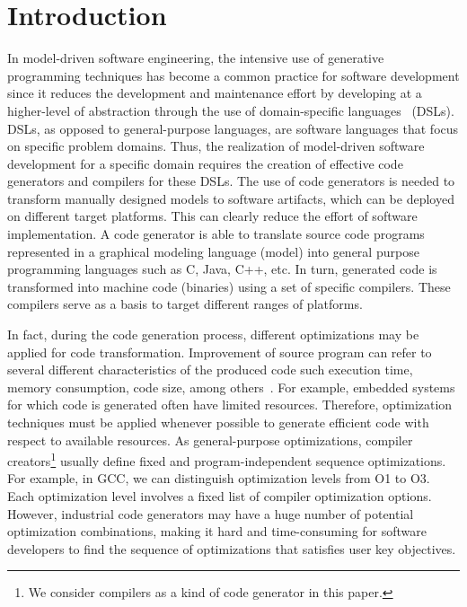 \section{Introduction}
In model-driven software engineering, the intensive use of generative programming techniques has become a common practice for software development since it reduces the development and maintenance effort by developing at a higher-level of abstraction through the use of domain-specific languages~\cite{brambilla2012model} (DSLs). 
DSLs, as opposed to general-purpose languages, are software languages that focus on specific problem domains. Thus, the realization of model-driven software development for a specific domain requires the creation of effective code generators and compilers for these DSLs.
The use of code generators is needed to transform manually designed models to software artifacts, which can be deployed on different target platforms. This can clearly reduce the effort of software implementation. A code generator is able to translate source code programs represented in a graphical modeling language (model) into general purpose programming languages such as C, Java, C++, etc. In turn, generated code is transformed into machine code (binaries) using a set of specific compilers.
These compilers serve as a basis to target different ranges of platforms. 

In fact, during the code generation process, different optimizations may be applied for code transformation. Improvement of source program can refer to several different characteristics of the produced code such execution time, memory consumption, code size, among others~\cite{almagor2004finding,pan2006fast}.
For example, embedded systems for which code is generated often have limited resources. 
Therefore, optimization techniques must be applied whenever possible to generate efficient code with respect to available resources\cite{nagiub2013automatic}. 
As general-purpose optimizations, compiler creators\footnote{We consider compilers as a kind of code generator in this paper.} usually define fixed and program-independent sequence optimizations.
For example, in GCC, we can distinguish optimization levels from O1 to O3. Each optimization level involves a fixed list of compiler optimization options. 
However, industrial code generators may have a huge number of potential optimization combinations, making it hard and time-consuming for software developers to find the sequence of optimizations that satisfies user key objectives. 

